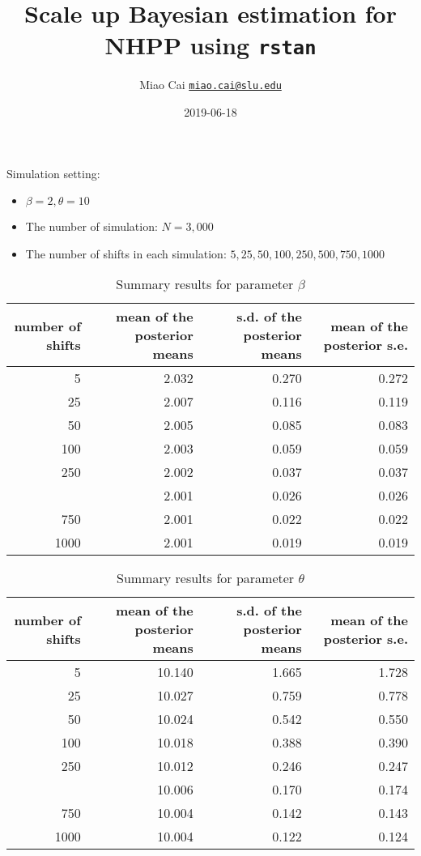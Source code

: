 \documentclass[]{article}
\title{Scale up Bayesian estimation for NHPP using \texttt{rstan}}
\author{Miao Cai \href{mailto:miao.cai@slu.edu}{\nolinkurl{miao.cai@slu.edu}}}
\date{2019-06-18}
\providecommand{\tightlist}{%
  \setlength{\itemsep}{0pt}\setlength{\parskip}{0pt}}
\begin{document}
\maketitle

Simulation setting:

\begin{itemize}
\tightlist
\item
  \(\beta = 2, \theta = 10\)
\item
  The number of simulation: \(N = 3,000\)
\item
  The number of shifts in each simulation: \(5, 25, 50, 100, 250, 500, 750, 1000\)
\end{itemize}

\begin{table}[t]

\caption{\label{tab:unnamed-chunk-4}Summary results for parameter $\beta$}
\centering
\begin{tabular}{rrrr}
\toprule
number of shifts & mean of the posterior means & s.d. of the posterior means & mean of the posterior s.e.\\
\midrule
5 & 2.032 & 0.270 & 0.272\\
25 & 2.007 & 0.116 & 0.119\\
50 & 2.005 & 0.085 & 0.083\\
100 & 2.003 & 0.059 & 0.059\\
250 & 2.002 & 0.037 & 0.037\\
\addlinespace
500 & 2.001 & 0.026 & 0.026\\
750 & 2.001 & 0.022 & 0.022\\
1000 & 2.001 & 0.019 & 0.019\\
\bottomrule
\end{tabular}
\end{table}

\begin{table}[t]

\caption{\label{tab:unnamed-chunk-5}Summary results for parameter $\theta$}
\centering
\begin{tabular}{rrrr}
\toprule
number of shifts & mean of the posterior means & s.d. of the posterior means & mean of the posterior s.e.\\
\midrule
5 & 10.140 & 1.665 & 1.728\\
25 & 10.027 & 0.759 & 0.778\\
50 & 10.024 & 0.542 & 0.550\\
100 & 10.018 & 0.388 & 0.390\\
250 & 10.012 & 0.246 & 0.247\\
\addlinespace
500 & 10.006 & 0.170 & 0.174\\
750 & 10.004 & 0.142 & 0.143\\
1000 & 10.004 & 0.122 & 0.124\\
\bottomrule
\end{tabular}
\end{table}
\end{document}
